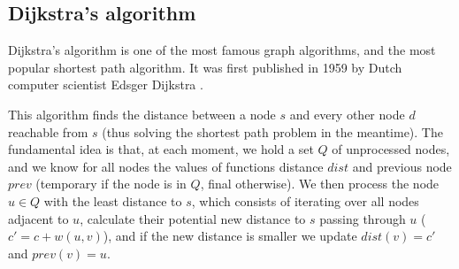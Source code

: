 \subsection{Dijkstra's algorithm}
Dijkstra's algorithm is one of the most famous graph algorithms, and the most popular shortest path algorithm. It was first published in 1959 by Dutch computer scientist Edsger Dijkstra \cite{dijkstra}.\par
This algorithm finds the distance between a node $s$ and every other node $d$ reachable from $s$ (thus solving the shortest path problem in the meantime). The fundamental idea is that, at each moment, we hold a set $Q$ of unprocessed nodes, and we know for all nodes the values of functions distance $dist$ and previous node $prev$ (temporary if the node is in $Q$, final otherwise). We then process the node $u \in Q$ with the least distance to $s$, which consists of iterating over all nodes adjacent to $u$, calculate their potential new distance to $s$ passing through $u$ ($c'=c+w(u,v)$), and if the new distance is smaller we update $dist(v)=c'$ and $prev(v)=u$.
